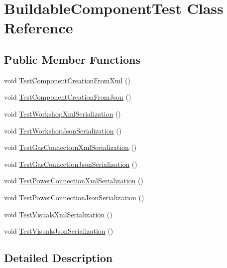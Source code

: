 \hypertarget{class_buildable_component_test}{}\section{Buildable\+Component\+Test Class Reference}
\label{class_buildable_component_test}
\subsection*{Public Member Functions}
\begin{DoxyCompactItemize}
\item 
void \hyperlink{class_buildable_component_test_a7993253dcfe95f854caa3bc3dcca7714}{Test\+Component\+Creation\+From\+Xml} ()
\item 
void \hyperlink{class_buildable_component_test_ac0a0ad56f72db6ab865ada501e82f70c}{Test\+Component\+Creation\+From\+Json} ()
\item 
void \hyperlink{class_buildable_component_test_addeafb31ae34b0eee14f6ea89b834b89}{Test\+Workshop\+Xml\+Serialization} ()
\item 
void \hyperlink{class_buildable_component_test_a14dee679cc597bb265b64938cb2fb2e0}{Test\+Workshop\+Json\+Serialization} ()
\item 
void \hyperlink{class_buildable_component_test_aeb6b8929dc3fd6f78b7e81f3a6bcb299}{Test\+Gas\+Connection\+Xml\+Serialization} ()
\item 
void \hyperlink{class_buildable_component_test_a676fd9c896319b2d504a1d9e254128ec}{Test\+Gas\+Connection\+Json\+Serialization} ()
\item 
void \hyperlink{class_buildable_component_test_a8cd86a86adfbc12eed4999de612a8265}{Test\+Power\+Connection\+Xml\+Serialization} ()
\item 
void \hyperlink{class_buildable_component_test_ad5499ba48b08e30f835ab76cf6a9be94}{Test\+Power\+Connection\+Json\+Serialization} ()
\item 
void \hyperlink{class_buildable_component_test_a9d653f67b0b259d8b7c183dd80cbae01}{Test\+Visuals\+Xml\+Serialization} ()
\item 
void \hyperlink{class_buildable_component_test_a87f9ccbbab32b42711255fa83dd42f72}{Test\+Visuals\+Json\+Serialization} ()
\end{DoxyCompactItemize}


\subsection{Detailed Description}


